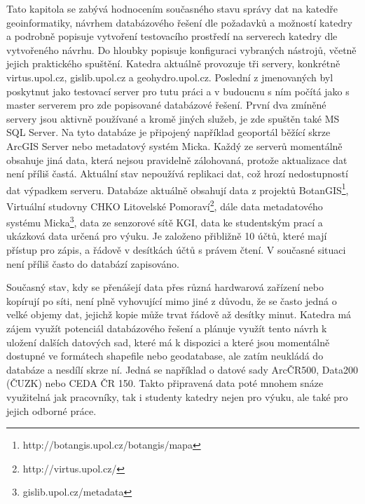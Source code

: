 Tato kapitola se zabývá hodnocením současného stavu správy dat na katedře geoinformatiky, návrhem databázového řešení dle požadavků a možností katedry a podrobně popisuje vytvoření testovacího prostředí na serverech katedry dle vytvořeného návrhu. Do hloubky popisuje konfiguraci vybraných nástrojů, včetně jejich praktického spuštění. 
Katedra aktuálně provozuje tři servery, konkrétně virtus.upol.cz, gislib.upol.cz a geohydro.upol.cz. Poslední z jmenovaných byl poskytnut jako testovací server pro tutu práci a v budoucnu s ním počítá jako s master serverem pro zde popisované databázové řešení. První dva zmíněné servery jsou aktivně používané a kromě jiných služeb, je zde spuštěn také MS SQL Server. Na tyto databáze je připojený například geoportál běžící skrze ArcGIS Server nebo metadatový systém Micka. Každý ze serverů momentálně obsahuje jiná data, která nejsou pravidelně zálohovaná, protože aktualizace dat není příliš častá. Aktuální stav nepoužívá replikaci dat, což hrozí nedostupností dat výpadkem serveru. 
Databáze aktuálně obsahují data z projektů BotanGIS\footnote{http://botangis.upol.cz/botangis/mapa}, Virtuální studovny CHKO Litovelské Pomoraví\footnote{http://virtus.upol.cz/}, dále data metadatového systému Micka\footnote{gislib.upol.cz/metadata}, data ze senzorové sítě KGI, data ke studentským prací a ukázková data určená pro výuku. Je založeno přibližně 10 účtů, které mají přístup pro zápis, a řádově v desítkách účtů s právem čtení. V současné situaci není příliš často do databází zapisováno. 

Současný stav, kdy se přenášejí data přes různá hardwarová zařízení nebo kopírují po síti, není plně vyhovující mimo jiné z důvodu, že se často jedná o velké objemy dat, jejichž kopie může trvat řádově až desítky minut. 
Katedra má zájem využít potenciál databázového řešení a plánuje využít tento návrh k uložení dalších datových sad, které má k dispozici a které jsou momentálně dostupné ve formátech shapefile nebo geodatabase, ale zatím neukládá do databáze a nesdílí skrze ní. Jedná se například o datové sady ArcČR500, Data200 (ČUZK) nebo CEDA ČR 150.
Takto připravená data poté mnohem snáze využitelná jak pracovníky, tak i studenty katedry nejen pro výuku, ale také pro jejich odborné práce. 
